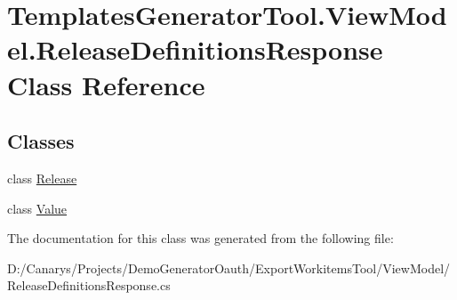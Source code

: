 \hypertarget{class_templates_generator_tool_1_1_view_model_1_1_release_definitions_response}{}\section{Templates\+Generator\+Tool.\+View\+Model.\+Release\+Definitions\+Response Class Reference}
\label{class_templates_generator_tool_1_1_view_model_1_1_release_definitions_response}
\subsection*{Classes}
\begin{DoxyCompactItemize}
\item 
class \mbox{\hyperlink{class_templates_generator_tool_1_1_view_model_1_1_release_definitions_response_1_1_release}{Release}}
\item 
class \mbox{\hyperlink{class_templates_generator_tool_1_1_view_model_1_1_release_definitions_response_1_1_value}{Value}}
\end{DoxyCompactItemize}


The documentation for this class was generated from the following file\+:\begin{DoxyCompactItemize}
\item 
D\+:/\+Canarys/\+Projects/\+Demo\+Generator\+Oauth/\+Export\+Workitems\+Tool/\+View\+Model/Release\+Definitions\+Response.\+cs\end{DoxyCompactItemize}
